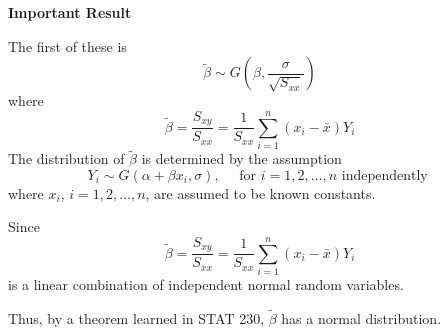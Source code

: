 \textbf{Important Result}

The first of these is
\[\tilde{\beta} \sim G\left(\beta, \frac{\sigma}{\sqrt{S_{x x}}}\right)\]
where
\[\tilde{\beta}=\frac{S_{x y}}{S_{x x}}=\frac{1}{S_{x x}} \sum_{i=1}^{n}\left(x_{i}-\bar{x}\right) Y_{i}\]
The distribution of $ \tilde{\beta} $ is determined by the assumption
\[Y_{i} \sim G\left(\alpha+\beta x_{i}, \sigma\right), \quad \text { for } i=1,2, \dots, n \text { independently }\]
where $ x_i $, $ i=1,2,\ldots ,n $, are assumed to be known constants.

Since
\[\tilde{\beta}=\frac{S_{x y}}{S_{x x}}=\frac{1}{S_{x x}} \sum_{i=1}^{n}\left(x_{i}-\bar{x}\right) Y_{i}\]
is a linear combination of independent normal random variables.

Thus, by a theorem learned in STAT 230, $ \tilde{\beta} $ has a normal distribution.


